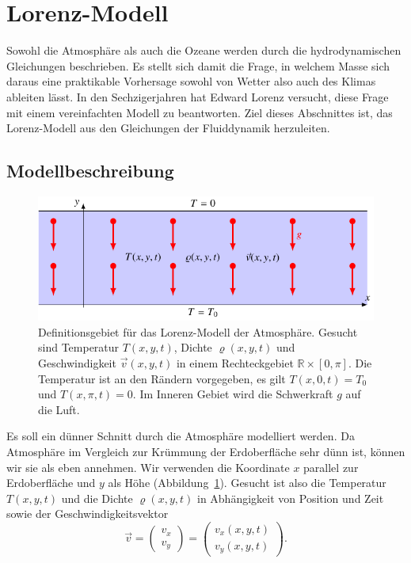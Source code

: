 %
%
%
%
\section{Lorenz-Modell}
Sowohl die Atmosphäre als auch die Ozeane werden durch die hydrodynamischen
Gleichungen beschrieben.
Es stellt sich damit die Frage, in welchem Masse sich daraus eine praktikable
Vorhersage sowohl von Wetter also auch des Klimas ableiten lässt.
In den Sechzigerjahren hat Edward Lorenz versucht, diese Frage mit einem
vereinfachten Modell zu beantworten.
Ziel dieses Abschnittes ist, das Lorenz-Modell aus den Gleichungen der
Fluiddynamik herzuleiten.

\subsection{Modellbeschreibung}
\begin{figure}
\centering
\includegraphics{chapters/2/lorenz-definition.pdf}
\caption{Definitionsgebiet für das Lorenz-Modell der Atmosphäre.
Gesucht sind Temperatur $T(x,y,t)$, Dichte $\varrho(x,y,t)$ und
Geschwindigkeit $\vec{v}(x,y,t)$ in einem Rechteckgebiet
$\mathbb R\times [0,\pi]$.
Die Temperatur ist an den Rändern vorgegeben, es gilt
$T(x,0,t)=T_0$ und $T(x,\pi,t)=0$.
Im Inneren Gebiet wird die Schwerkraft $g$ auf die Luft.
\label{skript:lorenzmodell definitionsgebiet}}
\end{figure}
Es soll ein dünner Schnitt durch die Atmosphäre modelliert werden.
Da Atmosphäre im Vergleich zur Krümmung der Erdoberfläche sehr dünn ist,
können wir sie als eben annehmen.
Wir verwenden die Koordinate $x$ parallel zur Erdoberfläche und $y$ als Höhe
(Abbildung~\ref{skript:lorenzmodell definitionsgebiet}).
Gesucht ist also die Temperatur $T(x,y,t)$ und die Dichte $\varrho(x,y,t)$
in Abhängigkeit von Position und Zeit sowie der Geschwindigkeitsvektor
\[
\vec v
=
\begin{pmatrix}v_x\\v_y\end{pmatrix}
=
\begin{pmatrix}v_x(x,y,t)\\v_y(x,y,t)\end{pmatrix}.
\]

